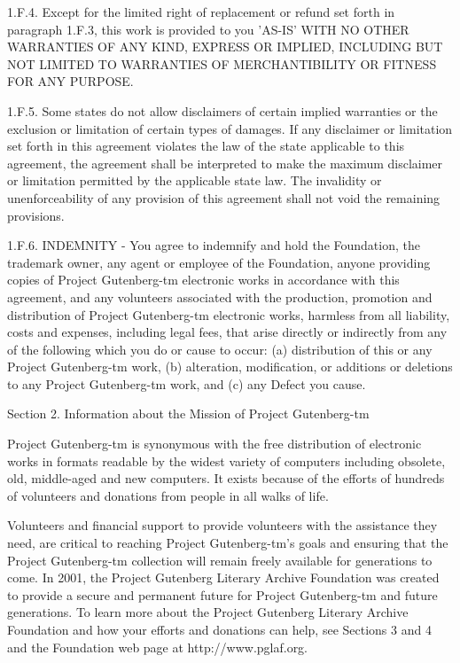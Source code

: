 \documentclass{article}
\begin{document}
1.F.4.  Except for the limited right of replacement or refund set forth
in paragraph 1.F.3, this work is provided to you 'AS-IS' WITH NO OTHER
WARRANTIES OF ANY KIND, EXPRESS OR IMPLIED, INCLUDING BUT NOT LIMITED TO
WARRANTIES OF MERCHANTIBILITY OR FITNESS FOR ANY PURPOSE.

1.F.5.  Some states do not allow disclaimers of certain implied
warranties or the exclusion or limitation of certain types of damages.
If any disclaimer or limitation set forth in this agreement violates the
law of the state applicable to this agreement, the agreement shall be
interpreted to make the maximum disclaimer or limitation permitted by
the applicable state law.  The invalidity or unenforceability of any
provision of this agreement shall not void the remaining provisions.

1.F.6.  INDEMNITY - You agree to indemnify and hold the Foundation, the
trademark owner, any agent or employee of the Foundation, anyone
providing copies of Project Gutenberg-tm electronic works in accordance
with this agreement, and any volunteers associated with the production,
promotion and distribution of Project Gutenberg-tm electronic works,
harmless from all liability, costs and expenses, including legal fees,
that arise directly or indirectly from any of the following which you do
or cause to occur: (a) distribution of this or any Project Gutenberg-tm
work, (b) alteration, modification, or additions or deletions to any
Project Gutenberg-tm work, and (c) any Defect you cause.


Section  2.  Information about the Mission of Project Gutenberg-tm

Project Gutenberg-tm is synonymous with the free distribution of
electronic works in formats readable by the widest variety of computers
including obsolete, old, middle-aged and new computers.  It exists
because of the efforts of hundreds of volunteers and donations from
people in all walks of life.

Volunteers and financial support to provide volunteers with the
assistance they need, are critical to reaching Project Gutenberg-tm's
goals and ensuring that the Project Gutenberg-tm collection will
remain freely available for generations to come.  In 2001, the Project
Gutenberg Literary Archive Foundation was created to provide a secure
and permanent future for Project Gutenberg-tm and future generations.
To learn more about the Project Gutenberg Literary Archive Foundation
and how your efforts and donations can help, see Sections 3 and 4
and the Foundation web page at http://www.pglaf.org.
\end{document}
